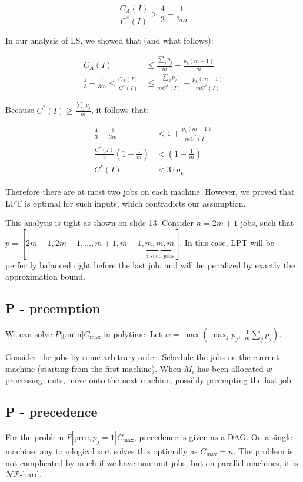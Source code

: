 \documentclass{idc_msc}
\newcommand{\NPclass}{\mathcal{NP}}
\begin{document}
\[
  \frac{C_A(I)}{C^*(I)} > \frac{4}{3} - \frac{1}{3m}
\]

In our analysis of LS, we showed that (and what follows):

\[
\begin{aligned}
C_A(I) &\le \frac{\sum_j p_j}{m} + \frac{p_k (m-1)}{m} \\
\frac{4}{3} - \frac{1}{3m} < \frac{C_A(I)}{C^*(I)} &\le \frac{\sum_j p_j}{m C^*(I)} + \frac{p_k (m-1)}{m C^*(I)}
\end{aligned}
\]

Because \(C^*(I) \ge \frac{\sum_j p_j}{m}\), it follows that:

\[
\begin{aligned}
\frac{4}{3} - \frac{1}{3m} &< 1 + \frac{p_k (m-1)}{m C^*(I)} \\
\frac{C^*(I)}{3} \left(1 - \frac{1}{m}\right) &< \left(1-\frac{1}{m}\right) \\
C^*(I) &< 3 \cdot p_k
\end{aligned}
\]

Therefore there are at most two jobs on each machine.
However, we proved that LPT is optimal for such inputs, which contradicts our assumption.

This analysis is tight as shown on slide 13.
Consider \(n = 2m + 1\) jobs, such that \(p = [2m-1, 2m-1, \ldots, m+1, m+1, \underbrace{m, m, m}_{\text{3 such jobs}}]\).
In this case, LPT will be perfectly balanced right before the last job, and will be penalized by exactly the approximation bound.

\subsection{P - preemption}

We can solve \(P|\text{pmtn}|C_{\max}\) in polytime.
Let \(w = \max \left( \max_j p_j, \; \frac{1}{m} \sum_j p_j \right)\).

Consider the jobs by some arbitrary order.
Schedule the jobs on the current machine (starting from the first machine).
When \(M_i\) has been allocated \(w\) processing units, move onto the next machine, possibly preempting the last job.

\subsection{P - precedence}

For the problem \(P|\text{prec}, p_j=1|C_{\max}\), precedence is given as a DAG.
On a single machine, any topological sort solves this optimally as \(C_{\max} = n\).
The problem is not complicated by much if we have non-unit jobs, but on parallel machines, it is \(\NPclass\)-hard.
\end{document}
